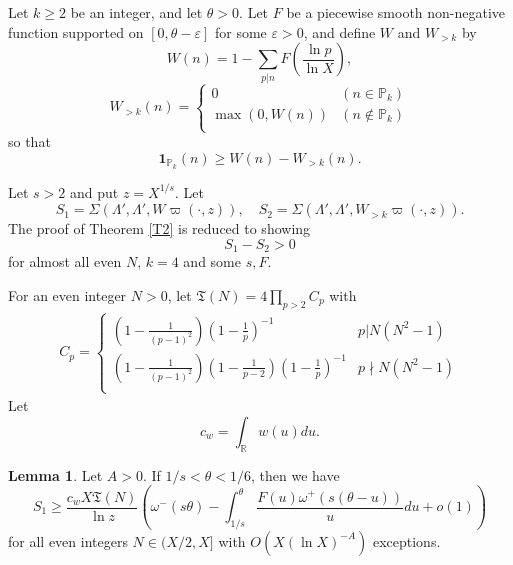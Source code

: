 \documentclass{amsart}
\theoremstyle{definition}
\newtheorem{lem}[dfn]{Lemma}
\theoremstyle{remark}
\newcommand{\1}{
    \bm{1}
}
\begin{document}
Let $k \geq 2$ be an integer, and let $\theta>0$. 
Let $F$ be a piecewise smooth non-negative function supported on $[0,\theta-\varepsilon]$ for some $\varepsilon>0$, and define $W$ and $W_{>k}$ by
\[ W(n) = 1-\sum_{p|n} F\left(\frac{\ln{p}}{\ln{X}}\right), \]
\[ W_{>k}(n) = 
\begin{cases}
0 & (n \in \mathbb{P}_k)  \\
\max(0,W(n)) & (n \notin \mathbb{P}_k) \\
\end{cases} \]
so that
\[ \1_{\mathbb{P}_k}(n) \geq W(n)-W_{>k}(n). \]





Let $s>2$ and put $z=X^{1/s}$. Let
\[ S_1 = \Sigma(\Lambda',\Lambda',W \varpi(\cdot,z)), \quad S_2 = \Sigma(\Lambda',\Lambda',W_{>k}\varpi(\cdot,z)). \]
The proof of Theorem \ref{T2} is reduced to showing
\[ S_1 - S_2 > 0 \]
for almost all even $N$, $k=4$ and some $s,F$. 





For an even integer $N>0$, let $\mathfrak{T}(N)=4 \prod_{p>2} C_p$ with
\begin{align*}
C_p =
\begin{cases}
\left(1 - \frac{1}{(p-1)^2} \right) \left(1- \frac{1}{p} \right)^{-1} & p|N(N^2-1) \\
\left(1 - \frac{1}{(p-1)^2} \right) \left(1 - \frac{1}{p-2} \right) \left(1- \frac{1}{p} \right)^{-1} & p\nmid N(N^2-1) \\
\end{cases}
\end{align*}
Let
\[ c_w = \int_{\mathbb{R}} w(u) du. \]





\begin{lem}\label{t1S1}
Let $A>0$. If $1/s<\theta < 1/6$, then we have
\[ S_1 \geq \frac{c_w X \mathfrak{T}(N)}{\ln{z}} \left(\omega^{-}(s\theta) - \int_{1/s}^{\theta} \frac{F(u) \omega^{+}(s(\theta-u))}{u} du +o(1) \right) \]
for all even integers $N \in (X/2,X]$ with $O(X(\ln{X})^{-A})$ exceptions. 
\end{lem}
\end{document}
